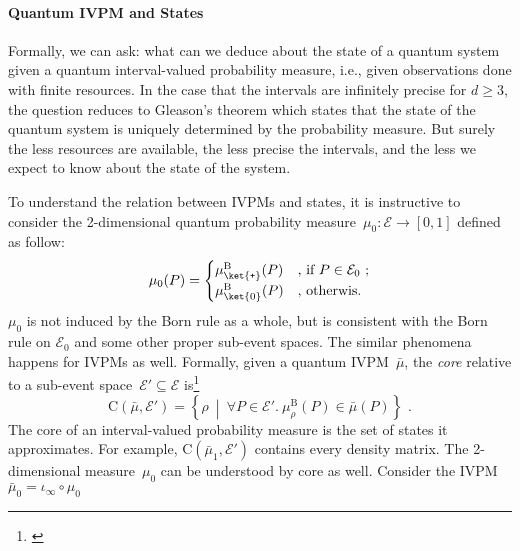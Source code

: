 \documentclass[english,reprint, aps, prl,superscriptaddress, showpacs,
showkeys, longbibliography, amsmath, amssymb]{revtex4-1}
\theoremstyle{plain}
\theoremstyle{definition}
\newcommand{\events}{\ensuremath{\mathcal{E}}}
\newcommand{\ps}{\texttt{+}}
\newcommand{\yutsung}[1]{\begin{framed}\begin{minipage}{0.9\linewidth}\color{purple}{Yu-Tsung says: #1}\end{minipage}\end{framed}}
\newcommand{\set}[2]{\ensuremath{\left\{ {#1}~\middle|~{#2}\right\} }}
\newcommand{\coreBorn}{\ensuremath{\mathrm{C}}}
\begin{document}
\paragraph{Quantum IVPM and States}

Formally, we can ask: what can we deduce about the state of a quantum
system given a quantum interval-valued probability measure, i.e.,
given observations done with finite resources. In the case that the
intervals are infinitely precise for $d\ge3$, the question reduces
to Gleason's theorem which states that the state of the quantum system
is uniquely determined by the probability measure. But surely the
less resources are available, the less precise the intervals, and
the less we expect to know about the state of the system.

To understand the relation between IVPMs and states, it is instructive
to consider the 2-dimensional quantum probability measure~$\mu_{0}:\events\rightarrow[0,1]$
defined as follow:
\begin{equation}
\mu_{0}(P)=\begin{cases}
\mu_{\ket{\ps}}^{\mathrm{B}}(P) & \textrm{, if }P\in\events_{0}\textrm{ ;}\\
\mu_{\ket{0}}^{\mathrm{B}}(P) & \textrm{, otherwis.}
\end{cases}
\end{equation}
$\mu_{0}$ is not induced by the Born rule as a whole, but is consistent
with the Born rule on $\events_{0}$ and some other proper sub-event
spaces. The similar phenomena happens for IVPMs as well. Formally,
given a quantum IVPM~$\bar{\mu}$, the \emph{core} relative to a
sub-event space~$\events'\subseteq\events$ is\footnote{\yutsung{I changed the definition of core to embedding the Born rule.
While this change might make it easier to explain the core of quantum
IVPMs, should we explain the meaning of the Born rule for classical
probability measures? Check this definition in the classical setting,
like commuting observables or product states... etc.}}
\begin{equation}
\coreBorn\left(\bar{\mu},\events'\right)=\set{\rho}{\forall P\in\events'.~\mu_{\rho}^{\mathrm{B}}\left(P\right)\in\bar{\mu}\left(P\right)}\textrm{ .}
\end{equation}
The core of an interval-valued probability measure is the set of states
it approximates. For example, $\coreBorn\left(\bar{\mu}_{1},\events'\right)$
contains every density matrix. The 2-dimensional measure~$\mu_{0}$
can be understood by core as well. Consider the IVPM~$\bar{\mu}_{0}=\iota_{\infty}\circ\mu_{0}$
\end{document}
